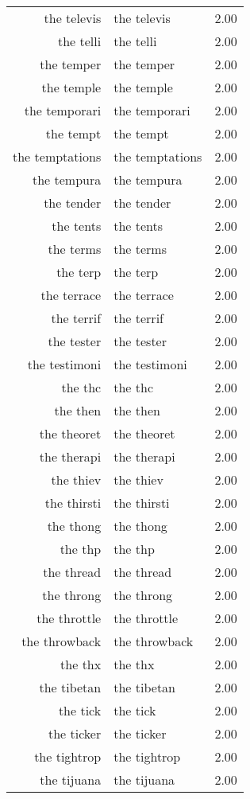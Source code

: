 \begin{table}[ht]
\begin{tabular}{rlr}
  the televis & the televis & 2.00 \\ 
  the telli & the telli & 2.00 \\ 
  the temper & the temper & 2.00 \\ 
  the temple & the temple & 2.00 \\ 
  the temporari & the temporari & 2.00 \\ 
  the tempt & the tempt & 2.00 \\ 
  the temptations & the temptations & 2.00 \\ 
  the tempura & the tempura & 2.00 \\ 
  the tender & the tender & 2.00 \\ 
  the tents & the tents & 2.00 \\ 
  the terms & the terms & 2.00 \\ 
  the terp & the terp & 2.00 \\ 
  the terrace & the terrace & 2.00 \\ 
  the terrif & the terrif & 2.00 \\ 
  the tester & the tester & 2.00 \\ 
  the testimoni & the testimoni & 2.00 \\ 
  the thc & the thc & 2.00 \\ 
  the then & the then & 2.00 \\ 
  the theoret & the theoret & 2.00 \\ 
  the therapi & the therapi & 2.00 \\ 
  the thiev & the thiev & 2.00 \\ 
  the thirsti & the thirsti & 2.00 \\ 
  the thong & the thong & 2.00 \\ 
  the thp & the thp & 2.00 \\ 
  the thread & the thread & 2.00 \\ 
  the throng & the throng & 2.00 \\ 
  the throttle & the throttle & 2.00 \\ 
  the throwback & the throwback & 2.00 \\ 
  the thx & the thx & 2.00 \\ 
  the tibetan & the tibetan & 2.00 \\ 
  the tick & the tick & 2.00 \\ 
  the ticker & the ticker & 2.00 \\ 
  the tightrop & the tightrop & 2.00 \\ 
  the tijuana & the tijuana & 2.00 \\ 

\end{tabular}
\end{table}
